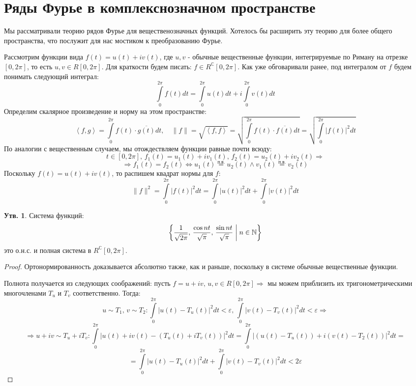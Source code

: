 \documentclass[12pt]{article}
\newcommand{\RN}[1]{%
	\textup{\uppercase\expandafter{\romannumeral#1}}%
}
\newcommand{\MC}{\mathbb{C}}
\newcommand{\MN}{\mathbb{N}}
\newcommand{\VE}{\varepsilon}
\theoremstyle{definition}
\newtheorem{prop}{Утв.}
\newcommand{\ddint}[2]{\displaystyle\int\limits_{#1}^{#2}}
\newcommand{\inner}[2]{\left\langle #1, #2 \right\rangle }
\begin{document}
\lhead{Математический анализ - \RN{3}}
\section*{Ряды Фурье в комплекснозначном пространстве}
Мы рассматривали теорию рядов Фурье для вещественозначных функций. Хотелось бы расширить эту теорию для более общего пространства, что послужит для нас мостиком к преобразованию Фурье.

Рассмотрим функции вида $f(t) = u(t) + iv(t)$, где $u,v$ - обычные вещественные функции, интегрируемые по Риману на отрезке $[0,2\pi]$, то есть $u,v \in R[0,2\pi]$. Для краткости будем писать: $f \in R^{\MC}[0,2\pi]$. Как уже обговаривали ранее, под интегралом от $f$ будем понимать следующий интеграл:
$$
	\ddint{0}{2\pi}f(t)dt = \ddint{0}{2\pi}u(t)dt + i\ddint{0}{2\pi}v(t)dt
$$
Определим скалярное произведение и норму на этом пространстве:
$$
	\inner{f}{g} = \ddint{0}{2\pi}f(t){\cdot}\overline{g(t)}dt, \quad \|f\| = \sqrt{\inner{f}{f}} = \sqrt{\ddint{0}{2\pi}f(t){\cdot}\overline{f(t)}dt} = \sqrt{\ddint{0}{2\pi}|f(t)|^2dt}
$$
По аналогии с вещественным случаем, мы отождествляем функции равные почти всюду:
$$
	t\in [0,2\pi], \, f_1(t) = u_1(t) + iv_1(t) , \, f_2(t) = u_2(t) + iv_2(t) \Rightarrow
$$
$$	
	\Rightarrow f_1(t) = f_2(t) \Leftrightarrow u_1(t) \overset{\text{п.в.}}{=} u_2(t) \wedge v_1(t) \overset{\text{п.в.}}{=} v_2(t)
$$
Поскольку $f(t) = u(t) + iv(t)$, то распишем квадрат нормы для $f$:
$$
	\|f\|^2 = \ddint{0}{2\pi}|f(t)|^2dt = \ddint{0}{2\pi}|u(t)|^2dt + \ddint{0}{2\pi}|v(t)|^2dt
$$

\begin{prop}
	Система функций:
	$$
		\left\{\dfrac{1}{\sqrt{2\pi}}, \, \dfrac{\cos{nt}}{\sqrt{\pi}}, \, \dfrac{\sin{nt}}{\sqrt{\pi}}  \biggm\vert  n \in \MN  \right\}
	$$
	это о.н.с. и полная система в $R^{\MC}[0,2\pi]$.
\end{prop}
\begin{proof}
	Ортонормированность доказывается абсолютно также, как и раньше, поскольку в системе обычные вещественные функции. 
	
	Полнота получается из следующих соображений: пусть $f = u + iv, \, u, v \in R[0,2\pi] \Rightarrow$ мы можем приблизить их тригонометрическими многочленами $T_u$ и $T_v$ соответственно. Тогда: 
	$$
		u \sim T_1, \, v \sim T_2 \colon \ddint{0}{2\pi}\left|u(t) - T_u(t)\right|^2dt < \VE, \, \ddint{0}{2\pi}\left|v(t) - T_v(t)\right|^2dt < \VE \Rightarrow
	$$
	$$
		\Rightarrow u + iv \sim T_u + i T_v \colon \ddint{0}{2\pi}\left|u(t) + iv(t) - (T_u(t) + iT_v(t))\right|^2dt = \ddint{0}{2\pi}\left|(u(t) - T_u(t)) + i(v(t) - T_2(t))\right|^2dt = 
	$$
	$$
		= \ddint{0}{2\pi}\left|u(t) - T_u(t)\right|^2dt + \ddint{0}{2\pi}\left|v(t) - T_v(t)\right|^2dt < 2\VE
	$$
\end{proof}
\end{document}
